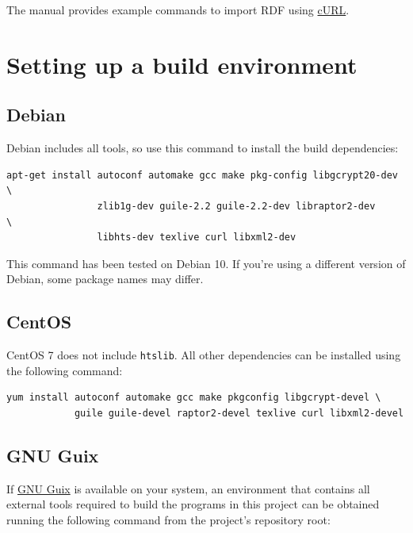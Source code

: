   The manual provides example commands to import RDF using
  \href{https://curl.haxx.se/}{cURL}.

\section{Setting up a build environment}

\subsection{Debian}

  Debian includes all tools, so use this command to install the
  build dependencies:

\begin{siderules}
\begin{verbatim}
apt-get install autoconf automake gcc make pkg-config libgcrypt20-dev   \
                zlib1g-dev guile-2.2 guile-2.2-dev libraptor2-dev       \
                libhts-dev texlive curl libxml2-dev
\end{verbatim}
\end{siderules}

  This command has been tested on Debian 10.  If you're using a different
  version of Debian, some package names may differ.

\subsection{CentOS}

  CentOS 7 does not include \texttt{htslib}.  All other dependencies can
  be installed using the following command:

\begin{siderules}
\begin{verbatim}
yum install autoconf automake gcc make pkgconfig libgcrypt-devel \
            guile guile-devel raptor2-devel texlive curl libxml2-devel
\end{verbatim}
\end{siderules}

\subsection{GNU Guix}

  If \href{https://www.gnu.org/software/guix}{GNU Guix} is available on your
  system, an environment that contains all external tools required to build
  the programs in this project can be obtained running the following command
  from the project's repository root:

